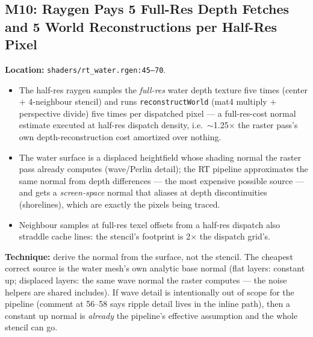 \documentclass[11pt,a4paper]{article}
\begin{document}
\subsection{M10: Raygen Pays 5 Full-Res Depth Fetches and 5 World Reconstructions per Half-Res Pixel}

\textbf{Location:} \texttt{shaders/rt\_water.rgen:45--70}.

\begin{itemize}
    \item The half-res raygen samples the \emph{full-res} water depth texture five times (center $+$ 4-neighbour stencil) and runs \texttt{reconstructWorld} (mat4 multiply $+$ perspective divide) five times per dispatched pixel --- a full-res-cost normal estimate executed at half-res dispatch density, i.e.\ $\sim$1.25$\times$ the raster pass's own depth-reconstruction cost amortized over nothing.
    \item The water surface is a displaced heightfield whose shading normal the raster pass already computes (wave/Perlin detail); the RT pipeline approximates the same normal from depth differences --- the most expensive possible source --- and gets a \emph{screen-space} normal that aliases at depth discontinuities (shorelines), which are exactly the pixels being traced.
    \item Neighbour samples at full-res texel offsets from a half-res dispatch also straddle cache lines: the stencil's footprint is 2$\times$ the dispatch grid's.
\end{itemize}

\textbf{Technique:} derive the normal from the surface, not the stencil. The cheapest correct source is the water mesh's own analytic base normal (flat layers: constant up; displaced layers: the same wave normal the raster computes --- the noise helpers are shared includes). If wave detail is intentionally out of scope for the pipeline (comment at 56--58 says ripple detail lives in the inline path), then a constant up normal is \emph{already} the pipeline's effective assumption and the whole stencil can go.
\end{document}
